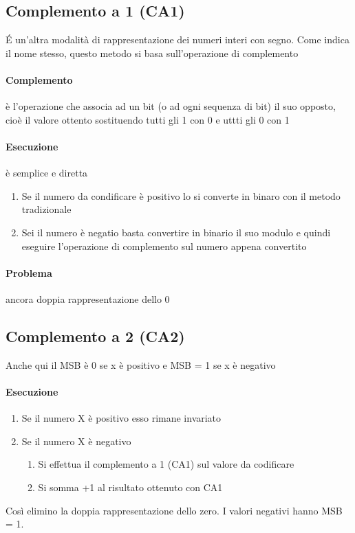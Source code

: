 \documentclass[12pt, a4paper, openany]{book}
\begin{document}
\subsection{Complemento a 1 (CA1)}
\'E un'altra modalità di rappresentazione dei numeri interi con segno. Come indica il nome stesso, questo metodo si basa sull'operazione di complemento

\paragraph{Complemento} è l'operazione che associa ad un bit (o ad ogni sequenza di bit) il suo opposto, cioè il valore ottento
sostituendo tutti gli 1 con 0 e uttti gli 0 con 1
\paragraph{Esecuzione} è semplice e diretta
\begin{enumerate}
    \item Se il numero da condificare è positivo lo si converte in binaro con il metodo tradizionale
    \item Sei il numero è negatio basta convertire in binario il suo modulo e quindi eseguire l'operazione di complemento sul numero appena convertito
\end{enumerate} 
\paragraph{Problema} ancora doppia rappresentazione dello 0

\subsection{Complemento a 2 (CA2)}
Anche qui il MSB è 0 se x è positivo e MSB = 1 se x è negativo
\paragraph{Esecuzione}
\begin{enumerate}
    \item Se il numero X è positivo esso rimane invariato
    \item Se il numero X è negativo
    \begin{enumerate}
        \item Si effettua il complemento a 1 (CA1) sul valore da codificare
        \item Si somma +1 al risultato ottenuto con CA1
    \end{enumerate}
\end{enumerate}
Così elimino la doppia rappresentazione dello zero. I valori negativi hanno MSB = 1.
\end{document}
